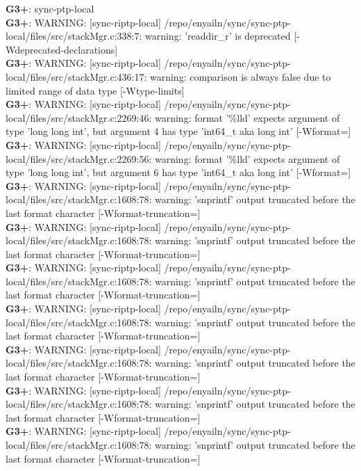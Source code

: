 \documentclass[12pt,twoside]{article}
\begin{document}
\textbf{G3+}: sync-ptp-local\\ 
\textbf{G3+}: WARNING: [sync-riptp-local] /repo/enyailn/sync/sync-ptp-local/files/src/stackMgr.c:338:7: warning: 'readdir\_r' is deprecated [-Wdeprecated-declarations]\\ 
\textbf{G3+}: WARNING: [sync-riptp-local] /repo/enyailn/sync/sync-ptp-local/files/src/stackMgr.c:436:17: warning: comparison is always false due to limited range of data type [-Wtype-limits]\\ 
\textbf{G3+}: WARNING: [sync-riptp-local] /repo/enyailn/sync/sync-ptp-local/files/src/stackMgr.c:2269:46: warning: format '\%lld' expects argument of type 'long long int', but argument 4 has type 'int64\_t {aka long int}' [-Wformat=]\\ 
\textbf{G3+}: WARNING: [sync-riptp-local] /repo/enyailn/sync/sync-ptp-local/files/src/stackMgr.c:2269:56: warning: format '\%lld' expects argument of type 'long long int', but argument 6 has type 'int64\_t {aka long int}' [-Wformat=]\\ 
\textbf{G3+}: WARNING: [sync-riptp-local] /repo/enyailn/sync/sync-ptp-local/files/src/stackMgr.c:1608:78: warning: 'snprintf' output truncated before the last format character [-Wformat-truncation=]\\ 
\textbf{G3+}: WARNING: [sync-riptp-local] /repo/enyailn/sync/sync-ptp-local/files/src/stackMgr.c:1608:78: warning: 'snprintf' output truncated before the last format character [-Wformat-truncation=]\\ 
\textbf{G3+}: WARNING: [sync-riptp-local] /repo/enyailn/sync/sync-ptp-local/files/src/stackMgr.c:1608:78: warning: 'snprintf' output truncated before the last format character [-Wformat-truncation=]\\ 
\textbf{G3+}: WARNING: [sync-riptp-local] /repo/enyailn/sync/sync-ptp-local/files/src/stackMgr.c:1608:78: warning: 'snprintf' output truncated before the last format character [-Wformat-truncation=]\\ 
\textbf{G3+}: WARNING: [sync-riptp-local] /repo/enyailn/sync/sync-ptp-local/files/src/stackMgr.c:1608:78: warning: 'snprintf' output truncated before the last format character [-Wformat-truncation=]\\ 
\textbf{G3+}: WARNING: [sync-riptp-local] /repo/enyailn/sync/sync-ptp-local/files/src/stackMgr.c:1608:78: warning: 'snprintf' output truncated before the last format character [-Wformat-truncation=]\\ 
\textbf{G3+}: WARNING: [sync-riptp-local] /repo/enyailn/sync/sync-ptp-local/files/src/stackMgr.c:1608:78: warning: 'snprintf' output truncated before the last format character [-Wformat-truncation=]\\ 
\end{document}
